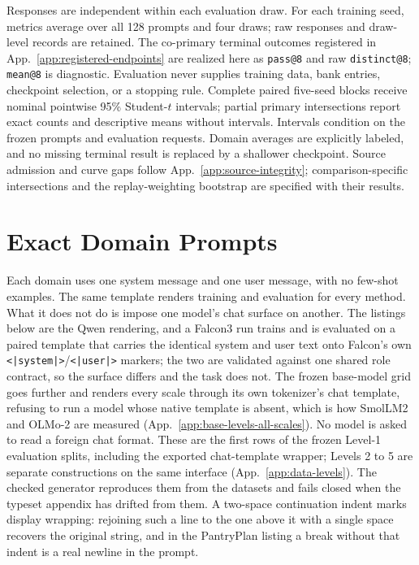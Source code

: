 \documentclass{article}
\newcommand{\1}{\mathbf 1}
\theoremstyle{remark}
\theoremstyle{definition}
\theoremstyle{plain}
\begin{document}
Responses are independent within each evaluation draw. For each training
seed, metrics average over all 128 prompts and four draws; raw responses
and draw-level records are retained. The co-primary terminal outcomes
registered in App.~\ref{app:registered-endpoints} are realized here as
\texttt{pass@8} and raw \texttt{distinct@8}; \texttt{mean@8} is diagnostic.
Evaluation never supplies training data, bank entries, checkpoint selection,
or a stopping rule. Complete paired five-seed blocks receive nominal
pointwise 95\% Student-$t$ intervals; partial primary intersections report
exact counts and descriptive means without intervals. Intervals condition
on the frozen prompts and evaluation requests. Domain averages are
explicitly labeled, and no missing terminal result is replaced by a
shallower checkpoint. Source admission and curve gaps follow
App.~\ref{app:source-integrity}; comparison-specific intersections and
the replay-weighting bootstrap are specified with their results.

\clearpage

\section{Exact Domain Prompts}
\label{app:prompts}

Each domain uses one system message and one user message, with no few-shot
examples. The same template renders training and evaluation for every
method. What it does not do is impose one model's chat surface on another.
The listings below are the Qwen rendering, and a Falcon3 run trains and is
evaluated on a paired template that carries the identical system and user
text onto Falcon's own \texttt{<|system|>}/\texttt{<|user|>} markers; the two
are validated against one shared role contract, so the surface differs and
the task does not. The frozen base-model grid goes further and renders every
scale through its own tokenizer's chat template, refusing to run a model
whose native template is absent, which is how SmolLM2 and OLMo-2 are measured
(App.~\ref{app:base-levels-all-scales}). No model is asked to read a foreign
chat format. These are the first rows of the frozen Level-1 evaluation splits,
including the exported chat-template wrapper; Levels 2 to 5 are separate
constructions on the same interface (App.~\ref{app:data-levels}). The checked
generator  reproduces them from the
datasets and fails closed when the typeset appendix has drifted from them.
A two-space continuation indent marks display wrapping: rejoining such a line
to the one above it with a single space recovers the original string, and in
the PantryPlan listing a break without that indent is a real newline in the
prompt.
\end{document}
